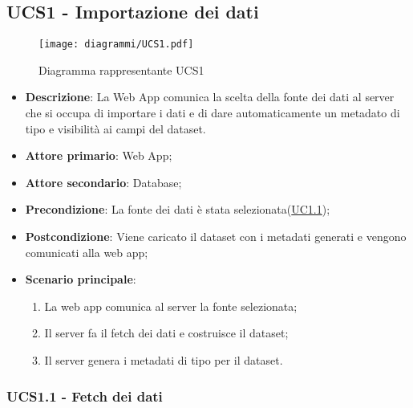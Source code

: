 \subsection{UCS1 - Importazione dei dati}
\label{sub:ucs1}


\begin{figure}[h]
    \centering
    \texttt{[image: diagrammi/UCS1.pdf]}
    \caption{Diagramma rappresentante UCS1}
    \label{fig:UCS1}
\end{figure}

\begin{itemize}
    \item \textbf{Descrizione}: La Web App comunica la scelta della fonte dei dati al server che si occupa di importare i dati e di dare automaticamente un metadato di tipo e visibilità ai campi del dataset.
	
    \item \textbf{Attore primario}: Web App;
	\item \textbf{Attore secondario}: Database;
        
    \item \textbf{Precondizione}:   La fonte dei dati è stata selezionata(\hyperref[ssub:uc1.1]{UC1.1});

    \item \textbf{Postcondizione}:  Viene caricato il dataset con i metadati generati e vengono comunicati alla web app;

	\item \textbf{Scenario principale}:
		\begin{enumerate}
			\item La web app comunica al server la fonte selezionata;
            \item Il server fa il fetch dei dati e costruisce il dataset;
			\item Il server genera i metadati di tipo per il dataset.
        \end{enumerate}
   
\end{itemize}

\subsubsection{UCS1.1 - Fetch dei dati}
\label{ssub:ucs1.1}

